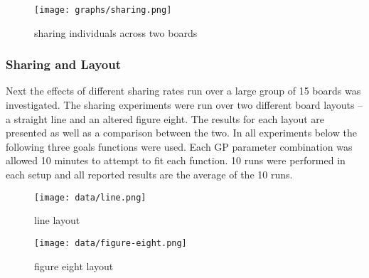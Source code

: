 \documentclass[11pt]{article}
\begin{document}
\begin{figure}[htb]
\centering
\texttt{[image: graphs/sharing.png]}
\caption{sharing individuals across two boards}
\end{figure}

\subsubsection*{Sharing and Layout}
\label{sec-1.5.3}

Next the effects of different sharing rates run over a large group of
15 boards was investigated.  The sharing experiments were run over two
different board layouts -- a straight line and an altered figure
eight.  The results for each layout are presented as well as a
comparison between the two.  In all experiments below the following
three goals functions were used.  Each GP parameter combination was
allowed 10 minutes to attempt to fit each function.  10 runs were
performed in each setup and all reported results are the average of
the 10 runs.

\begin{figure}[htb]
\centering
\texttt{[image: data/line.png]}
\caption{line layout}
\end{figure}

\begin{figure}[htb]
\centering
\texttt{[image: data/figure-eight.png]}
\caption{figure eight layout}
\end{figure}
\end{document}
